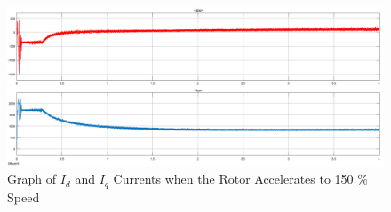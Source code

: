 \documentclass{article}
\begin{document}
\begin{figure}[H]
    \centering
    \includegraphics[scale=0.2]{field_weaken.png}
    \caption{Graph of $I_d$ and $I_q$ Currents when the Rotor Accelerates to 150 \% Speed }
    \label{fig:my_label}
\end{figure} \\
\end{document}
